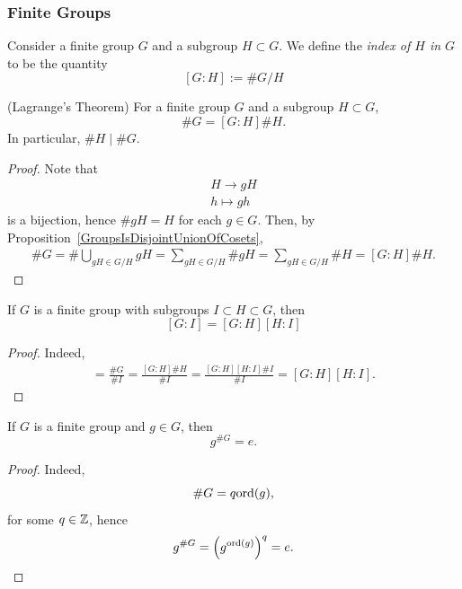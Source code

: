 \subsubsection{Finite Groups}
\begin{definition}
    Consider a finite group $G$ and a subgroup $H\subset G$. We define the \emph{index of $H$ in $G$} to be the quantity
    $$
        [G : H] := \#G/H
    $$
\end{definition}
\begin{proposition}(Lagrange's Theorem)
    For a finite group $G$ and a subgroup $H\subset G$,
    $$
        \#G = [G:H]\#H.
    $$
    In particular, $ \#H\mid \#G$. 
\end{proposition}
\begin{proof}
    Note that 
    \begin{gather*}
        H \rightarrow gH\\
        h\mapsto gh
    \end{gather*}
    is a bijection, hence $\#gH = H$ for each $g\in G$. 
    Then, by Proposition~\ref{GroupsIsDisjointUnionOfCosets},
    \begin{align*}
        \#G= \#\bigcup_{gH\in G/H} gH = \sum_{gH\in G/H} \#gH = \sum_{gH\in G/H} \#H = [G:H]\#H. 
    \end{align*}
\end{proof}
\begin{corollary}
    If $G$ is a finite group with subgroups $I\subset H\subset G$, then 
    $$
        [G:I] = [G:H][H:I]
    $$ 
\end{corollary}
\begin{proof}
    Indeed, 
    \begin{align*}
        [G:I] = \frac{\#G}{\#I}=\frac{[G:H]\#H}{\#I}=\frac{[G:H][H:I]\#I}{\#I} = [G:H][H:I].
    \end{align*}
\end{proof}
\begin{corollary}
    If $G$ is a finite group and $g\in G$, then 
    $$
        g^{\#G} = e.
    $$
\end{corollary}
\begin{proof}
    Indeed, 
    $$
        \#G = q\mathrm{ord}(g),
    $$
    for some $q\in \mathbb{Z}$, hence 
    $$
        g^{\#G} = \left(g^{\mathrm{ord}(g)}\right)^{q} = e. 
    $$
\end{proof}

